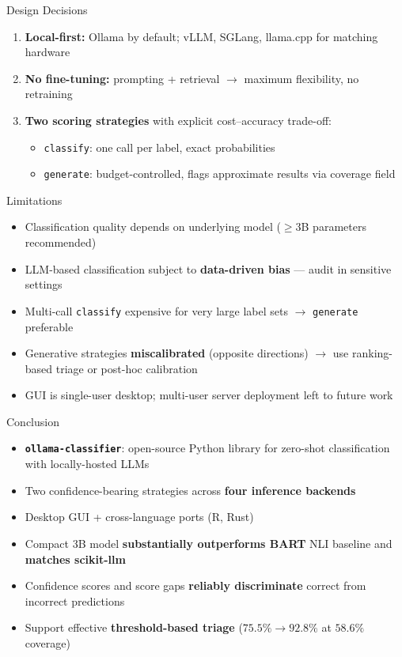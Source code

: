 \documentclass[aspectratio=169,11pt]{beamer}
\begin{document}
\begin{frame}{Design Decisions}
  \begin{enumerate}
    \item \textbf{Local-first:} Ollama by default; vLLM, SGLang, llama.cpp
          for matching hardware
    \item \textbf{No fine-tuning:} prompting + retrieval $\to$ maximum
          flexibility, no retraining
    \item \textbf{Two scoring strategies} with explicit cost--accuracy
          trade-off:
          \begin{itemize}
            \item \texttt{classify}: one call per label, exact probabilities
            \item \texttt{generate}: budget-controlled, flags approximate
                  results via coverage field
          \end{itemize}
  \end{enumerate}
\end{frame}

\begin{frame}{Limitations}
  \begin{itemize}
    \item Classification quality depends on underlying model ($\geq 3$B
          parameters recommended)
    \item LLM-based classification subject to \textbf{data-driven bias} —
          audit in sensitive settings
    \item Multi-call \texttt{classify} expensive for very large label sets
          $\to$ \texttt{generate} preferable
    \item Generative strategies \textbf{miscalibrated} (opposite directions)
          $\to$ use ranking-based triage or post-hoc calibration
    \item GUI is single-user desktop; multi-user server deployment left to
          future work
  \end{itemize}
\end{frame}

\begin{frame}{Conclusion}
  \begin{itemize}
    \item \textbf{\texttt{ollama-classifier}}: open-source Python library for
          zero-shot classification with locally-hosted LLMs
    \item Two confidence-bearing strategies across \textbf{four inference
          backends}
    \item Desktop GUI + cross-language ports (R, Rust)
    \item Compact 3B model \textbf{substantially outperforms BART} NLI
          baseline and \textbf{matches scikit-llm}
    \item Confidence scores and score gaps \textbf{reliably discriminate}
          correct from incorrect predictions
    \item Support effective \textbf{threshold-based triage}
          ($75.5\% \to 92.8\%$ at $58.6\%$ coverage)
  \end{itemize}

\end{frame}
\end{document}

